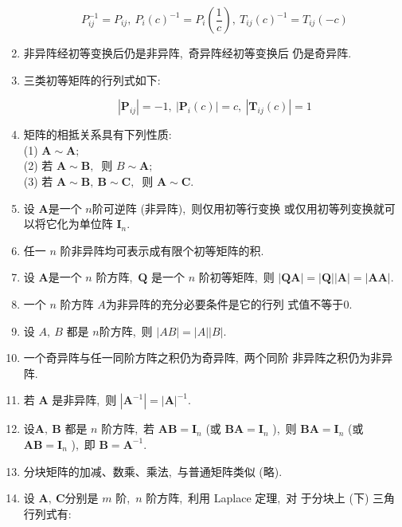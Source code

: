 \begin{enumerate}
		$$P_{i j}^{-1}=P_{i j},\  P_{i}(c)^{-1}=P_{i}\left(\frac{1}{c}\right),\  T_{i j}(c)^{-1}=T_{i j}(-c)$$
		
		\item 非异阵经初等变换后仍是非异阵,\  奇异阵经初等变换后 仍是奇异阵.
		\item 三类初等矩阵的行列式如下:
		
		$$	\left|\boldsymbol{P}_{i j}\right|=-1,\ \left|\boldsymbol{P}_{i}(c)\right|=c,\ \left|\boldsymbol{T}_{i j}(c)\right|=1$$
		
		\item 矩阵的相抵关系具有下列性质:\\
		(1) $ \boldsymbol{A} \sim \boldsymbol{A} ;$\\
		(2) 若 $ \boldsymbol{A} \sim \boldsymbol{B} ,\ $ 则  $B \sim \boldsymbol{A} ;$\\
		(3) 若 $ \boldsymbol{A} \sim \boldsymbol{B},\  \boldsymbol{B} \sim \boldsymbol{C} ,\ $ 则 $ \boldsymbol{A} \sim \boldsymbol{C} .$
		\item 设 $ \boldsymbol{A}  $是一个  $n  $阶可逆阵 (非异阵),\  则仅用初等行变换 或仅用初等列变换就可以将它化为单位阵 $ \boldsymbol{I}_{n} .$
		\item 任一  $n$  阶非异阵均可表示成有限个初等矩阵的积.
		\item 设  $\boldsymbol{A}  $是一个  $n $ 阶方阵,\ $  \boldsymbol{Q} $ 是一个  $n $ 阶初等矩阵,\  则 $ |\boldsymbol{Q A}|=|\boldsymbol{Q}||\boldsymbol{A}|=|\boldsymbol{A} \boldsymbol{A}| .$
		
		\item 一个  $n $ 阶方阵  $A  $为非异阵的充分必要条件是它的行列 式值不等于$ 0 .$
		\item 设 $ A,\  B $ 都是 $ n  $阶方阵,\  则  $|A B|=|A||B| .$
		\item 一个奇异阵与任一同阶方阵之积仍为奇异阵,\  两个同阶 非异阵之积仍为非异阵.
		\item 若 $ \boldsymbol{A} $ 是非异阵,\  则  $\left|\boldsymbol{A}^{-1}\right|=|\boldsymbol{A}|^{-1} .$
		\item $设  \boldsymbol{A},\  \boldsymbol{B} $ 都是 $ n $ 阶方阵,\  若  $\boldsymbol{A B}=\boldsymbol{I}_{n} $ (或  $\boldsymbol{B} \boldsymbol{A}=\boldsymbol{I}_{n} $ ),\  则  $\boldsymbol{B A}=\boldsymbol{I}_{n} $ (或  $\boldsymbol{A B}=\boldsymbol{I}_{n} $ ),\  即 $ \boldsymbol{B}=\boldsymbol{A}^{-1} .$
		\item 分块矩阵的加减、数乘、乘法,\  与普通矩阵类似 (略).
		\item 设 $ \boldsymbol{A},\  \boldsymbol{C}  $分别是  $m $ 阶,\ $  n $ 阶方阵,\  利用 Laplace 定理,\  对 于分块上 (下) 三角行列式有:
		

\end{enumerate}
